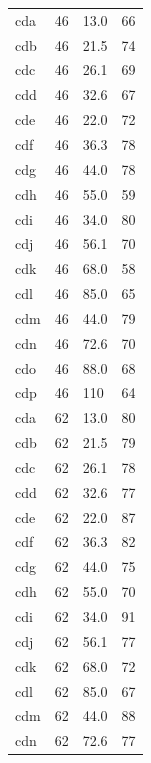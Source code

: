 \documentclass[draft]{agujournal2019}
\begin{document}
\begin{longtable}{A{0.13} B{0.12} B{0.12} B{0.10}}
 cda        & 46         & 13.0       & 66    \\
 cdb        & 46         & 21.5       & 74    \\
 cdc        & 46         & 26.1       & 69    \\
 cdd        & 46         & 32.6       & 67    \\
 cde        & 46         & 22.0       & 72    \\
 cdf        & 46         & 36.3       & 78    \\
 cdg        & 46         & 44.0       & 78    \\
 cdh        & 46         & 55.0       & 59    \\
 cdi        & 46         & 34.0       & 80    \\
 cdj        & 46         & 56.1       & 70    \\
 cdk        & 46         & 68.0       & 58    \\
 cdl        & 46         & 85.0       & 65    \\
 cdm        & 46         & 44.0       & 79    \\
 cdn        & 46         & 72.6       & 70    \\
 cdo        & 46         & 88.0       & 68    \\
 cdp        & 46         & 110        & 64    \\
 cda        & 62         & 13.0       & 80    \\
 cdb        & 62         & 21.5       & 79    \\
 cdc        & 62         & 26.1       & 78    \\
 cdd        & 62         & 32.6       & 77    \\
 cde        & 62         & 22.0       & 87    \\
 cdf        & 62         & 36.3       & 82    \\
 cdg        & 62         & 44.0       & 75    \\
 cdh        & 62         & 55.0       & 70    \\
 cdi        & 62         & 34.0       & 91    \\
 cdj        & 62         & 56.1       & 77    \\
 cdk        & 62         & 68.0       & 72    \\
 cdl        & 62         & 85.0       & 67    \\
 cdm        & 62         & 44.0       & 88    \\
 cdn        & 62         & 72.6       & 77    \\

\end{longtable}
\end{document}
